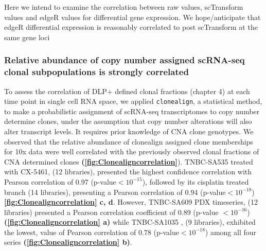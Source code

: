 Here we intend to examine the correlation between raw values, scTransform values and edgeR values for differential gene expression. We hope/anticipate that edgeR differential expression is reasonably correlated to post scTransform at the same gene loci





 




\subsubsection{Relative abundance of copy number assigned scRNA-seq clonal subpopulations is strongly correlated}
 
 To assess the correlation of DLP+ defined clonal fractions (chapter 4) at each time point in single cell RNA space, we applied \texttt{clonealign}, a statistical method, \cite{campbell2019clonealign} to make a probabilistic assignment of scRNA-seq transcriptomes to copy number determine clones, under the assumption that copy number alterations will also alter transcript levels. It requires prior knowledge of CNA clone genotypes.
 We observed that the relative abundance of clonealign assigned clone memberships for 10x data were well correlated with the previously observed clonal fractions of CNA determined clones \textbf{(\autoref{fig:Clonealigncorrelation}}). TNBC-SA535 treated with CX-5461, (12 libraries), presented the highest confidence correlation with Pearson correlation of 0.97 (p-value$< 10^{-15}$), followed by its cisplatin treated branch (14 libraries), presenting a Pearson correlation of 0.94 (p-value$< 10^{-18}$) \textbf{\autoref{fig:Clonealigncorrelation} c, d}. However, TNBC-SA609 PDX timeseries, (12 libraries) presented a Pearson correlation coefficient of 0.89 (p-value $< 10^{-16}$) \textbf{(\autoref{fig:Clonealigncorrelation} a)} while TNBC-SA1035 , (9 libraries), exhibited the lowest, value of Pearson correlation of 0.78 (p-value$< 10^{-18}$) among all four series \textbf{(\autoref{fig:Clonealigncorrelation} b)}.
  

